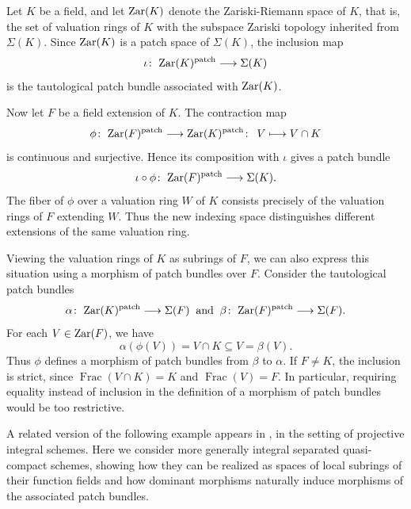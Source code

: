 \documentclass[11pt]{amsart}
\begin{document}
\begin{example}\label{ex: zariski inclusion} 
Let $K$ be a field, and let ${\rm Zar}(K)$ denote the Zariski-Riemann space of $K$, that is, the set of valuation rings of $K$ with the subspace Zariski topology inherited from $\Sigma(K)$.
Since ${\rm Zar}(K)$ is a patch space of $\Sigma(K)$, the inclusion map
\[
\iota\colon\; {\rm Zar}(K)^{\rm patch}
\longrightarrow \Sigma(K)
\]
is the tautological patch bundle associated with
${\rm Zar}(K)$. 

Now let $F$ be a field extension of $K$. The contraction map
\[
\phi\colon\; {\rm Zar}(F)^{\rm patch} \longrightarrow  {\rm Zar}(K)^{\rm patch}\colon\; \,V \longmapsto V \cap K
\]
is continuous and surjective. Hence its composition with $\iota$ gives a patch bundle
\[
\iota\circ\phi\colon\; {\rm Zar}(F)^{\rm patch}
\longrightarrow \Sigma(K).
\]
The fiber of $\phi$ over a valuation ring $W$ of $K$
consists precisely of the valuation rings of $F$
extending $W$. Thus the new indexing space
distinguishes different extensions of the same
valuation ring.

Viewing the valuation rings of $K$ as subrings of $F$, we can also express this situation using
a morphism of patch bundles over $F$. Consider the tautological patch bundles
\[
\alpha\colon\; {\rm Zar}(K)^{\rm patch}
\longrightarrow \Sigma(F)
\: \text{ and }\:
\beta\colon\; {\rm Zar}(F)^{\rm patch}
\longrightarrow \Sigma(F).
\]
For each $V\in {\rm Zar}(F)$, we have
\[
\alpha(\phi(V))=V\cap K\subseteq V=\beta(V).
\]
Thus $\phi$ defines a morphism of patch bundles from $\beta$ to $\alpha$. If $F\ne K$, the
inclusion is strict, since $\operatorname{Frac}(V\cap K)=K$ and $\operatorname{Frac}(V)=F$.
In particular, requiring equality instead of inclusion in the definition of a morphism of patch bundles would be too restrictive.
\end{example}

A related version of the following example appears in \cite[Example~3.3(6)]{CosOlb}, in the setting of projective integral schemes. Here we consider more generally integral separated quasi-compact schemes, showing how they can be realized as spaces of local subrings of their function fields and how dominant morphisms naturally induce morphisms of the associated patch bundles.
\end{document}
